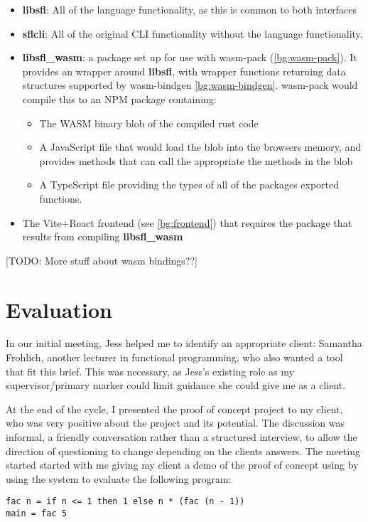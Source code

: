\begin{itemize}
    \item \textbf{libsfl}: All of the language functionality, as this is common to both interfaces
    \item \textbf{sflcli}: All of the original CLI functionality without the language functionality.  
    \item \textbf{libsfl\_wasm}: a package set up for use with wasm-pack (\ref{bg:wasm-pack}). It provides an wrapper around \textbf{libsfl}, with wrapper functions returning data structures supported by wasm-bindgen \ref{bg:wasm-bindgen}. wasm-pack would compile this to an \ac{NPM} package containing:
    \begin{itemize}
        \item The WASM binary blob of the compiled rust code
        \item A JavaScript file that would load the blob into the browsers memory, and provides methods that can call the appropriate the methods in the blob
        \item A TypeScript file providing the types of all of the packages exported functions. 
    \end{itemize}
    \item The Vite+React frontend (see \ref{bg:frontend}) that requires the package that results from compiling \textbf{libsfl\_wasm}
\end{itemize}


[TODO: More stuff about wasm bindings??]

\section{Evaluation}
\label{eval:c1}
In our initial meeting, Jess helped me to identify an appropriate client: Samantha Frohlich, another lecturer in functional programming, who also wanted a tool that fit this brief. This was necessary, as Jess's existing role as my supervisor/primary marker could limit guidance she could give me as a client. 

At the end of the cycle, I presented the proof of concept project to my client, who was very positive about the project and its potential. The discussion was informal, a friendly conversation rather than a structured interview, to allow the direction of questioning to change depending on the clients answers. The meeting started started with me giving my client a demo of the proof of concept using by using the system to evaluate the following program:
\begin{verbatim}
fac n = if n <= 1 then 1 else n * (fac (n - 1))
main = fac 5
\end{verbatim}

